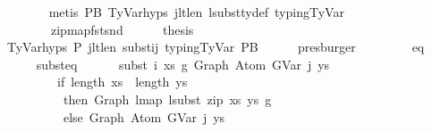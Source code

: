 \begin{isabellebody}
\ \ \ \ \ \ \isamarkupfalse%
\ {\isacharparenleft}{\kern0pt}metis\ P{}B\ TyVar{\isachardot}{\kern0pt}hyps{\isacharparenleft}{\kern0pt}{}{\isacharcomma}{\kern0pt}{}{\isacharcomma}{\kern0pt}{}{\isacharcomma}{\kern0pt}{}{\isacharcomma}{\kern0pt}{}{\isacharparenright}{\kern0pt}\ j{}{\isacharunderscore}{\kern0pt}lt{\isacharunderscore}{\kern0pt}len{\isacharunderscore}{\kern0pt}{\isasymGamma}{}\ lsubst{\isacharunderscore}{\kern0pt}ty{\isacharunderscore}{\kern0pt}def\ typing{\isachardot}{\kern0pt}TyVar\isanewline
\ \ \ \ \ \ \ \ zip{\isacharunderscore}{\kern0pt}map{\isacharunderscore}{\kern0pt}fst{\isacharunderscore}{\kern0pt}snd{\isacharparenright}{\kern0pt}\isanewline
\isanewline
\ \ \ \ \isamarkupfalse%
\ {\isacharquery}{\kern0pt}thesis\isanewline
\ \ \ \ \ \ \isamarkupfalse%
\ TyVar{\isachardot}{\kern0pt}hyps{\isacharparenleft}{\kern0pt}{}{\isacharcomma}{\kern0pt}{}{\isacharcomma}{\kern0pt}{}{\isacharcomma}{\kern0pt}{}{\isacharcomma}{\kern0pt}{}{\isacharparenright}{\kern0pt}\ P{}\ j{}{\isacharunderscore}{\kern0pt}lt{\isacharunderscore}{\kern0pt}len{\isacharunderscore}{\kern0pt}{\isasymGamma}{}\ subst{\isacharunderscore}{\kern0pt}ij\ typing{\isachardot}{\kern0pt}TyVar\ P{}B\isanewline
\ \ \ \ \isamarkupfalse%
\ presburger\isanewline
\ \ \isamarkupfalse%
\isanewline
\ \ \ \ \isamarkupfalse%
\ eq\isanewline
\ \ \ \ \isamarkupfalse%
\ subst{\isacharunderscore}{\kern0pt}eq{\isacharcolon}{\kern0pt}\isanewline
\ \ \ \ \ \ {\isachardoublequoteopen}subst\ i\ xs\ g{}\ {\isacharparenleft}{\kern0pt}Graph\ {\isacharparenleft}{\kern0pt}Atom\ {\isacharparenleft}{\kern0pt}GVar\ j{\isacharparenright}{\kern0pt}\ ys{\isacharparenright}{\kern0pt}{\isacharparenright}{\kern0pt}\ {\isacharequal}{\kern0pt}\isanewline
\ \ \ \ \ \ \ \ \ {\isacharparenleft}{\kern0pt}if\ length\ xs\ {\isacharequal}{\kern0pt}\ length\ ys\isanewline
\ \ \ \ \ \ \ \ \ \ then\ Graph\ {\isacharparenleft}{\kern0pt}lmap\ {\isacharparenleft}{\kern0pt}lsubst\ {\isacharparenleft}{\kern0pt}zip\ xs\ ys{\isacharparenright}{\kern0pt}{\isacharparenright}{\kern0pt}\ g{}{\isacharparenright}{\kern0pt}\isanewline
\ \ \ \ \ \ \ \ \ \ else\ Graph\ {\isacharparenleft}{\kern0pt}Atom\ {\isacharparenleft}{\kern0pt}GVar\ j{\isacharparenright}{\kern0pt}\ ys{\isacharparenright}{\kern0pt}{\isacharparenright}{\kern0pt}{\isachardoublequoteclose}\isanewline

\end{isabellebody}
